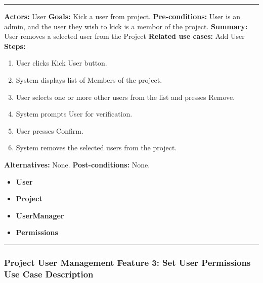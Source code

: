 \documentclass[twoside,letterpaper]{article}
\begin{document}
	\vspace{2pt}
	\hrule
	\vspace{8pt}
	 \textbf{Actors:} User \newline
	\textbf{Goals:} Kick a user from project. \newline
	 \textbf{Pre-conditions:} User is an admin, and the user they wish to kick is a membor of the project. \newline
	 \textbf{Summary:} User removes a selected user from the Project \newline
	\textbf{Related use cases:} Add User \newline
	\textbf{Steps:} \begin{enumerate}
	  \item User clicks Kick User button.
	  \item System displays list of Members of the project.
	  \item User selects one or more other users from the list and presses Remove.
	  \item System prompts User for verification.
	  \item User presses Confirm.
	  \item System removes the selected users from the project.
	 \end{enumerate}
	 \textbf{Alternatives:} None. \newline
	 \textbf{Post-conditions:} None. \newline
	\begin{itemize}
		\item \textbf{User}
		\item \textbf{Project}
		\item \textbf{UserManager}
		\item \textbf{Permissions}
	\end{itemize}
	\vspace{8pt}
	\hrule
	\newpage
	
	\subsubsection[Project User Management Feature 3: Set User Permissions Use Case Description ]{\rmfamily\bfseries\color{black}
		Project User Management Feature 3: Set User Permissions Use Case Description}
	\hypertarget{RefHeading22059017292}{}
	
\end{document}

